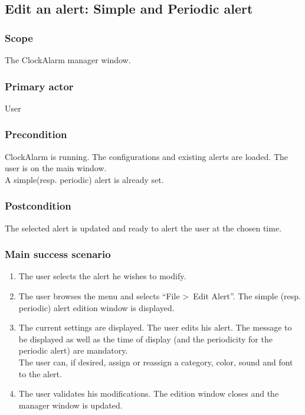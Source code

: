 \subsection{Edit an alert: Simple and Periodic alert}\label{subsec:usecase_edit_simple_alert}

\subsubsection{Scope}
The ClockAlarm manager window.
\subsubsection{Primary actor}
User
\subsubsection{Precondition}
ClockAlarm is running. The configurations and existing alerts are loaded. The user is on the main window.
\\A simple(resp. periodic) alert is already set.
\subsubsection{Postcondition}
The selected alert is updated and ready to alert the user at the chosen time.
\subsubsection{Main success scenario}
\begin{enumerate}
	\item The user selects the alert he wishes to modify.
	\item \label{itm:ucae_edit_spa} The user browses the menu and selects ``File \textgreater~Edit Alert''. The simple (resp. periodic) alert edition window is displayed. 
	\item \label{itm:ucae_enter_spa} The current settings are displayed. The user edits his alert. The message to be displayed as well as the time of display (and the periodicity for the periodic alert) are mandatory. \\The user can, if desired, assign or reassign a category, color, sound and font to the alert.
	\item \label{itm:ucae_validate_spa} The user validates his modifications. The edition window closes and the manager window is updated.
\end{enumerate}
